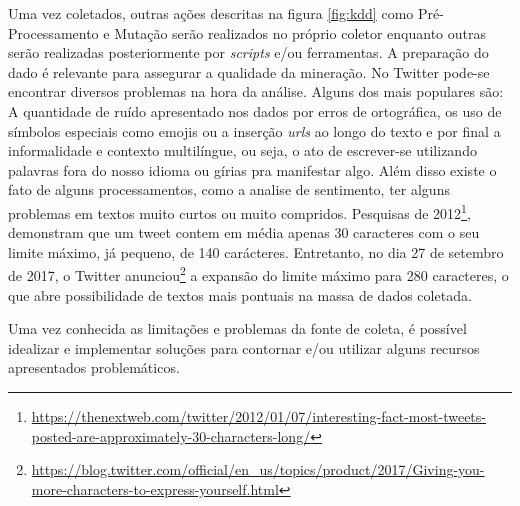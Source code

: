 Uma vez coletados, outras ações descritas na figura \ref{fig:kdd} como Pré-Processamento e Mutação serão realizados no próprio coletor enquanto outras serão realizadas posteriormente por \textit{scripts} e/ou ferramentas. A preparação do dado é relevante para assegurar a qualidade da mineração. No Twitter pode-se encontrar diversos problemas na hora da análise. Alguns dos mais populares são: A quantidade de ruído apresentado nos dados por erros de ortográfica, os uso de símbolos especiais como emojis ou a inserção \textit{urls} ao longo do texto e por final a informalidade e contexto multilíngue, ou seja, o ato de escrever-se utilizando palavras fora do nosso idioma ou gírias pra manifestar algo. Além disso existe o fato de alguns processamentos, como a analise de sentimento, ter alguns problemas em textos muito curtos ou muito compridos. Pesquisas de 2012\footnote{\url{https://thenextweb.com/twitter/2012/01/07/interesting-fact-most-tweets-posted-are-approximately-30-characters-long/}}, demonstram que um tweet contem em média apenas 30 caracteres com o seu limite máximo, já pequeno, de 140 carácteres. \cite[9-11]{silva2016analise} Entretanto, no dia 27 de setembro de 2017, o Twitter anunciou\footnote{\url{https://blog.twitter.com/official/en_us/topics/product/2017/Giving-you-more-characters-to-express-yourself.html}} a expansão do limite máximo para 280 caracteres, o que abre possibilidade de textos mais pontuais na massa de dados coletada.

Uma vez conhecida as limitações e problemas da fonte de coleta, é possível idealizar e implementar soluções para contornar e/ou utilizar alguns recursos apresentados problemáticos.
